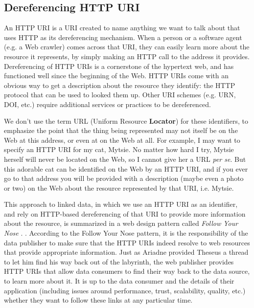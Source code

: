 \hypertarget{dereferencing-http-uri}{%
\subsection{Dereferencing HTTP URI }\label{dereferencing-http-uri}}

An HTTP URI is a URI created to name anything we want to talk about 
that  uses  HTTP   as its dereferencing mechanism. When a person or a
software agent (e.g. a Web crawler) comes across that URI, they can easily learn more
about the resource it represents,  by simply making an HTTP call
to the address it provides.   Dereferencing of HTTP URIs is a cornerstone of the hypertext web, and has
functioned well since the beginning of the Web. HTTP URIs come with an
obvious way to get a description about the resource they identify: the
HTTP protocol that can be used to looked them up. Other URI schemes
(e.g. URN, DOI, etc.) require additional services or practices to be
dereferenced.  

We don't use the term URL (Uniform Resource \textbf{Locator}) for these identifiers, to emphasize the 
point that the thing  being
represented may not itself be on the Web at this address, or even at on the Web at all. For example, I
may want to specify an HTTP URI for my cat, Mytsie. No matter how hard I
try, Mytsie herself will never be located on the Web, so I cannot give
her a URL \emph{per se}. But this adorable cat can be identified on the
Web by an HTTP URI, and if you ever go to that address you will be
provided with a description (maybe even a photo or two) on the Web about the resource represented by
that URI, i.e.  Mytsie.

This approach to linked data, in which we use an HTTP URI as an identifier, and 
rely on HTTP-based dereferencing of that URI to provide more information about the resource, 
is summarized in a web design pattern called \emph{Follow Your Nose} \cite{dodds2012linked}. .
According to the  Follow Your Nose pattern,  it is the responsibility of the data publisher
to make sure that the HTTP URIs indeed resolve to web resources that provide
appropriate information. Just as Ariadne provided Theseus a thread to let him
find his way back out of the labyrinth, the web publisher provides HTTP URIs
that allow data consumers to find their way back to the data source, to
learn more about it.  It is up to the data consumer and the details of their application (including issues around performance, trust, scalability,
quality, etc.)
whether they want to follow these links at any particular time. 

